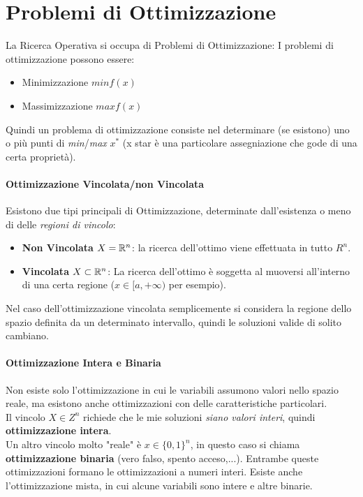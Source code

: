 \documentclass[12pt, a4paper, openany]{book}
\begin{document}
\section{Problemi di Ottimizzazione}
La Ricerca Operativa si occupa di Problemi di Ottimizzazione:
I problemi di ottimizzazione possono essere:
\begin{itemize}
    \item Minimizzazione $min f(x)$
    \item Massimizzazione $max f(x)$
\end{itemize}

Quindi un problema di ottimizzazione consiste nel determinare (se esistono) uno o più punti di \emph{min}/\emph{max} $x^*$ (x star è una particolare assegniazione che gode di una certa proprietà).

\paragraph*{Ottimizzazione Vincolata/non Vincolata}
Esistono due tipi principali di Ottimizzazione, determinate dall'esistenza o meno di delle \emph{regioni di vincolo}:
\begin{itemize}
    \item \textbf{Non Vincolata} $X = \mathbb{R}^n$: la ricerca dell'ottimo viene effettuata in tutto $R^n$.
    \item \textbf{Vincolata} $X \subset \mathbb{R}^n$: La ricerca dell'ottimo è soggetta al muoversi all'interno di una certa regione ($x \in [a, +\infty)$ per esempio).
\end{itemize}

Nel caso dell'ottimizzazione vincolata semplicemente si considera la regione dello spazio definita da un determinato intervallo,
quindi le soluzioni valide di solito cambiano.
\paragraph*{Ottimizzazione Intera e Binaria}
Non esiste solo l'ottimizzazione in cui le variabili assumono valori nello spazio reale, ma esistono anche ottimizzazioni con delle caratteristiche particolari.
\\Il vincolo $X\in Z^n$ richiede che le mie soluzioni \emph{siano valori interi}, quindi \textbf{ottimizzazione intera}.
\\Un altro vincolo molto "reale" è $x\in \{0,1\}^n$, in questo caso si chiama \textbf{ottimizzazione binaria} (vero falso, spento acceso,...).
Entrambe queste ottimizzazioni formano le ottimizzazioni a numeri interi.
Esiste anche l'ottimizzazione mista, in cui alcune variabili sono intere e altre binarie.
\end{document}
